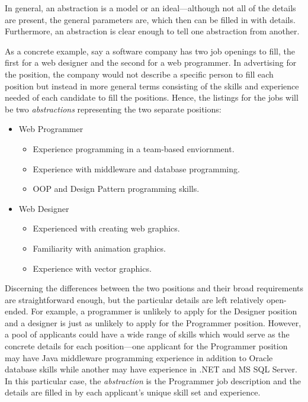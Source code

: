 \documentclass[12pt]{report}
\begin{document}
\begin{doublespace}
In general, an abstraction is a model or an ideal---although not all of the details are present, the general parameters are, which then can be filled in with details. Furthermore, an abstraction is clear enough to tell one abstraction from another. 

As a concrete example, say a software company has two job openings to fill, the first for a web designer and the second for a web programmer. In advertising for the position, the company would not describe a specific person to fill each position but instead in more general terms consisting of the skills and experience needed of each candidate to fill the positions. Hence, the listings for the jobs will be two \textit{abstractions} representing the two separate positions:

\begin{itemize}
\item Web Programmer
\begin{itemize}
\item Experience programming in a team-based enviornment.
\item Experience with middleware and database programming.
\item OOP and Design Pattern programming skills.
\end{itemize}
\item Web Designer
\begin{itemize}
\item Experienced with creating web graphics.
\item Familiarity with animation graphics.
\item Experience with vector graphics.
\end{itemize}
\end{itemize}

Discerning the differences between the two positions and their broad requirements are straightforward enough, but the particular details are left relatively open-ended. For example, a programmer is unlikely to apply for the Designer position and a designer is just as unlikely to apply for the Programmer position. However, a pool of applicants could have a wide range of skills which would serve as the concrete details for each position---one applicant for the Programmer position may have Java middleware programming experience in addition to Oracle database skills while another may have experience in .NET and MS SQL Server. In this particular case, the \textit{abstraction} is the Programmer job description and the details are filled in by each applicant's unique skill set and experience.


\end{doublespace}
\end{document}
